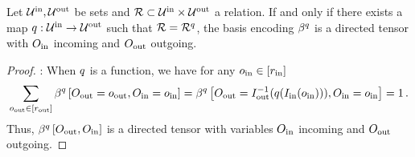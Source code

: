\begin{theorem}
    \label{the:bencodingDirected}
    Let $\mathcal{U}^{\mathrm{in}},\mathcal{U}^{\mathrm{out}}$ be sets and $\mathcal{R}\subset\mathcal{U}^{\mathrm{in}}\times\mathcal{U}^{\mathrm{out}}$ a relation.
    If and only if there exists a map $q:\mathcal{U}^{\mathrm{in}}\rightarrow\mathcal{U}^{\mathrm{out}}$ such that $\mathcal{R}=\mathcal{R}^{q}$, the basis encoding $\beta^{q}$ is a directed tensor with $O_{\mathrm{in}}$ incoming and $O_{\mathrm{out}}$ outgoing.
\end{theorem}
\begin{proof}
    \proofrightsymbol{}:
    When $q$ is a function, we have for any $o_{\mathrm{in}}\in[r_{\mathrm{in}}]$
    \begin{align*}
        \sum_{o_{\mathrm{out}}\in[r_{\mathrm{out}}]} \beta^{q}\left[O_{\mathrm{out}}=o_{\mathrm{out}},O_{\mathrm{in}}=o_{\mathrm{in}}\right]
        =  \beta^{q}\left[O_{\mathrm{out}}=I_{\mathrm{out}}^{-1}(q(I_{\mathrm{in}}(o_{\mathrm{in}}))),O_{\mathrm{in}}=o_{\mathrm{in}}\right]
        = 1 \, .
    \end{align*}
    Thus, $\beta^{q}\left[O_{\mathrm{out}},O_{\mathrm{in}}\right]$ is a directed tensor with variables $O_{\mathrm{in}}$ incoming and $O_{\mathrm{out}}$ outgoing.


\end{proof}
